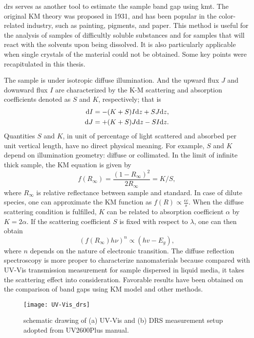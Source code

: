 \Gls{drs} serves as another tool to estimate the sample band gap using \gls{kmt}.\cite{Tandon1970} The original KM theory was proposed in 1931,\cite{Kubelka1931} and has been popular in the color-related industry, such as painting, pigments, and paper. This method is useful for the analysis of samples of difficultly soluble substances and for samples that will react with the solvents upon being dissolved. It is also particularly applicable when single crystals of the material could not be obtained. Some key points were recapitulated in this thesis.

The sample is under isotropic diffuse illumination. And the upward flux $J$ and downward flux $I$ are characterized by the K-M scattering and absorption coefficients denoted as $S$ and $K$, respectively; that is
\begin{align}
\mathrm{d} I &= - (K + S)I \mathrm{d} z + SJ\mathrm{d} z,\\
\mathrm{d} J &= + (K + S)J \mathrm{d} z - SI\mathrm{d} z.
\end{align}
Quantities $S$ and $K$, in unit of percentage of light scattered and absorbed per unit vertical length, have no direct physical meaning. For example, $S$ and $K$ depend on illumination geometry: diffuse or collimated. In the limit of infinite thick sample, the KM equation is given by
\begin{equation}
f(R_\infty) = \frac{(1-R_\infty)^2}{2R_\infty} = K/S,
\end{equation}
where $R_\infty$ is relative reflectance between sample and standard. In case of dilute species, one can approximate the KM function as $f(R) \propto \frac{\epsilon c}{s}$. When the diffuse scattering condition is fulfilled, $K$ can be related to absorption coefficient $\alpha$ by $K = 2\alpha$. If the scattering coefficient $S$ is fixed with respect to $\lambda$, one can then obtain
\begin{equation}
(f(R_\infty) h \nu)^n \propto (hv - E_g),
\end{equation}
where $n$ depends on the nature of electronic transition. The diffuse reflection spectroscopy is more proper to characterize nanomaterials because compared with UV-Vis transmission measurement for sample dispersed in liquid media, it takes the scattering effect into consideration. Favorable results have been obtained on the comparison of band gaps using KM model and other methods.\cite{Tandon1970,Morales2007} 

\begin{figure}[htb]
\centering
\texttt{[image: UV-Vis\_drs]}
\caption[UV-Vis and DRS measurement]{schematic drawing of (a) UV-Vis and (b) DRS measurement setup adopted from UV2600Plus manual.}
\label{fig:ch2uvvis}
\end{figure}

